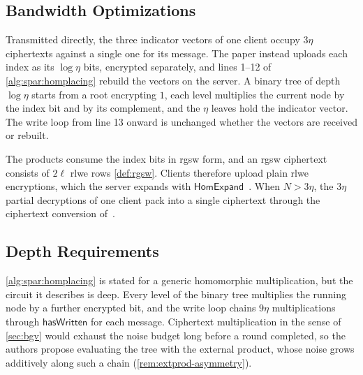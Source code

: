 \subsection{Bandwidth Optimizations}
\label{sec:spar:bandwidth}
Transmitted directly, the three indicator vectors of one client occupy $3\eta$ ciphertexts against a single one for its message. The paper instead uploads each index as its $\log\eta$ bits, encrypted separately, and lines 1--12 of \autoref{alg:spar:homplacing} rebuild the vectors on the server. A binary tree of depth $\log\eta$ starts from a root encrypting $1$, each level multiplies the current node by the index bit and by its complement, and the $\eta$ leaves hold the indicator vector. The write loop from line 13 onward is unchanged whether the vectors are received or rebuilt.

The products consume the index bits in \gls{rgsw} form, and an \gls{rgsw} ciphertext consists of $2\ell$ \gls{rlwe} rows \eqref{def:rgsw}. Clients therefore upload plain \gls{rlwe} encryptions, which the server expands with $\mathsf{HomExpand}$~\cite{chillotti:onionring:2019, park:sortinghat:2022, cryptoeprint:2025/1088}. When $N > 3\eta$, the $3\eta$ partial decryptions of one client pack into a single ciphertext through the ciphertext conversion of~\cite{cryptoeprint:2020/015}.

\newpage

\subsection{Depth Requirements}
\label{sec:spar:requirements}
\autoref{alg:spar:homplacing} is stated for a generic homomorphic multiplication, but the circuit it describes is deep. Every level of the binary tree multiplies the running node by a further encrypted bit, and the write loop chains $9\eta$ multiplications through $\mathsf{hasWritten}$ for each message. Ciphertext multiplication in the sense of \autoref{sec:bgv} would exhaust the noise budget long before a round completed, so the authors propose evaluating the tree with the external product, whose noise grows additively along such a chain (\autoref{rem:extprod-asymmetry}).

